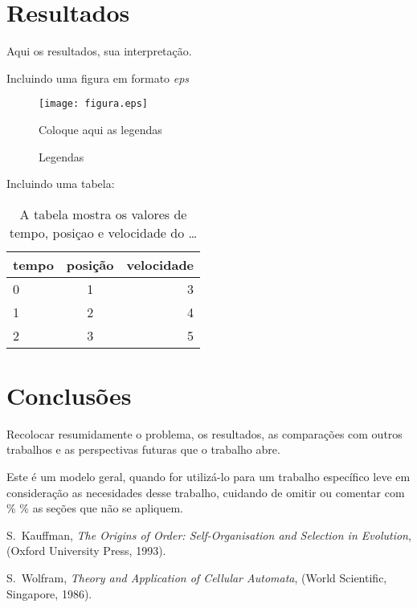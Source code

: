 \section{Resultados}
\vspace{2cm}
 Aqui os resultados, sua interpretação.

Incluindo uma figura em formato {\it eps}

\begin{figure}[hbtp]
\begin{center}
\texttt{[image: figura.eps]}
\caption{Coloque aqui as legendas}
\label{fig}
\end{center}
\end{figure}
\vspace{0.5cm}

\begin{figure}[htbp]
\begin{center}
\caption{Legendas}
\label{fig_rotacao}
\end{center}
\end{figure}



Incluindo uma tabela:
\begin{table}[h]
\begin{tabular}{||l|c|r||} \hline
tempo& posição & velocidade\\
\hline
 0 & 1 & 3\\
 1 & 2 & 4\\
 2 & 3 & 5\\
 \hline
 \end{tabular}
 \caption{A tabela mostra os valores de tempo, posiçao e velocidade do
{\ldots} }
\end{table}

\section{Conclusões}
Recolocar resumidamente o problema, os resultados, as comparações \cite{Wolfram_book} com outros
trabalhos e as perspectivas futuras que o trabalho abre.

{\color{red} Este é um modelo geral, quando for utilizá-lo para um trabalho
específico leve em consideração as necesidades desse trabalho,
cuidando de omitir ou comentar com \% \% as seções que não
se apliquem.}

\begin{thebibliography}{99}

S.~Kauffman, {\em The Origins of Order: Self-Organisation and
Selection in Evolution}, (Oxford University Press, 1993).

S.~Wolfram, {\em Theory and Application of Cellular Automata},
(World Scientific, Singapore, 1986).

\end{thebibliography}



